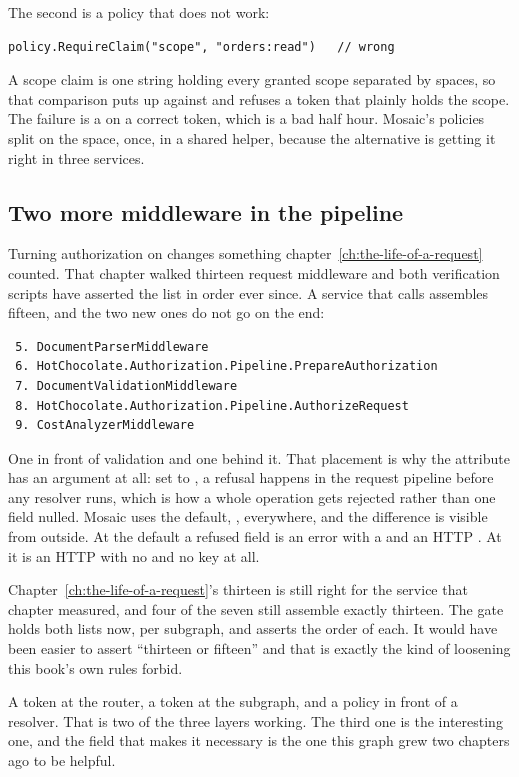 The second is a policy that does not work:

\begin{verbatim}
policy.RequireClaim("scope", "orders:read")   // wrong
\end{verbatim}

A scope claim is one string holding every granted scope separated by spaces, so
that comparison puts  up against
 and refuses a token that plainly holds the scope. The
failure is a  on a correct token, which is a bad half hour. Mosaic's
policies split on the space, once, in a shared helper, because the alternative
is getting it right in three services.

\subsection*{Two more middleware in the pipeline}

%
Turning authorization on changes something
chapter~\ref{ch:the-life-of-a-request} counted. That chapter walked thirteen
request middleware and both verification scripts have asserted the list in order
ever since. A service that calls  assembles fifteen,
and the two new ones do not go on the end:

\begin{verbatim}
 5. DocumentParserMiddleware
 6. HotChocolate.Authorization.Pipeline.PrepareAuthorization
 7. DocumentValidationMiddleware
 8. HotChocolate.Authorization.Pipeline.AuthorizeRequest
 9. CostAnalyzerMiddleware
\end{verbatim}

One in front of validation and one behind it. That placement is why the
\code{[Authorize]} attribute has an  argument at all: set to
, a refusal happens in the request pipeline before any resolver
runs, which is how a whole operation gets rejected rather than one field nulled.
Mosaic uses the default, , everywhere, and the difference
is visible from outside. At the default a refused field is an error with a
 and an HTTP . At  it is an HTTP
 with no  and no  key at all.

Chapter~\ref{ch:the-life-of-a-request}'s thirteen is still right for the service
that chapter measured, and four of the seven still assemble exactly thirteen.
The gate holds both lists now, per subgraph, and asserts the order of each. It
would have been easier to assert \enquote{thirteen or fifteen} and that is
exactly the kind of loosening this book's own rules forbid.

\medskip
A token at the router, a token at the subgraph, and a policy in front of a
resolver. That is two of the three layers working. The third one is the
interesting one, and the field that makes it necessary is the one this graph
grew two chapters ago to be helpful.

%
